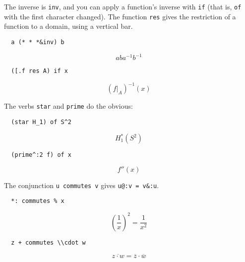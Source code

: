 \documentclass{article}
\begin{document}
The inverse is \lstinline`inv`, and you can apply a function's inverse with
\lstinline`if` (that is, \lstinline`of` with the first character changed).
The function \lstinline`res` gives the restriction of a function to a domain,
using a vertical bar.
\begin{lstlisting}
  a (* * *&inv) b
\end{lstlisting}
\[a b a^{-1} b^{-1}\]
\begin{lstlisting}
  ([.f res A) if x
\end{lstlisting}
\[\left(f|_A\right)^{-1}(x)\]

The verbs \lstinline`star` and \lstinline`prime` do the obvious:
\begin{lstlisting}
  (star H_1) of S^2
\end{lstlisting}
\[H_1^*\left(S^2\right)\]
\begin{lstlisting}
  (prime^:2 f) of x
\end{lstlisting}
\[f''(x)\]

The conjunction \lstinline`u commutes v` gives \lstinline`u@:v = v&:u`.
\begin{lstlisting}
  *: commutes % x
\end{lstlisting}
\[\left(\frac{1}{x}\right)^2=\frac{1}{x^2}\]
\begin{lstlisting}
  z + commutes \\cdot w
\end{lstlisting}
\[\overline{z \cdot w}=\overline{z} \cdot \overline{w}\]
\end{document}
